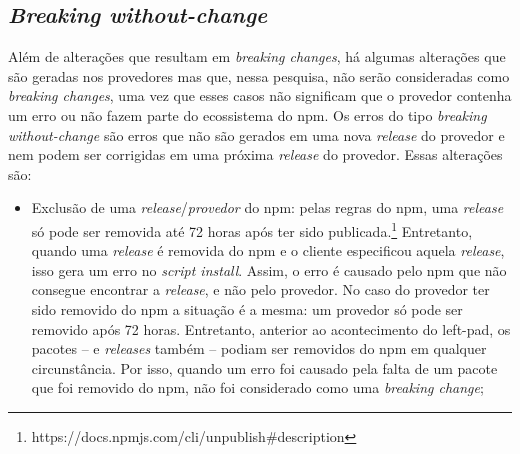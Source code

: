 \subsection{\textit{Breaking without-change}}
\label{subsec:break_without}
Além de alterações que resultam em \textit{breaking changes}, há algumas alterações que são geradas nos provedores mas que, nessa pesquisa, não serão consideradas como \textit{breaking changes}, uma vez que esses casos não significam que o provedor contenha um erro ou não fazem parte do ecossistema do \textsf{npm}. Os erros do tipo \textit{breaking without-change} são erros que não são gerados em uma nova \textit{release} do provedor e nem podem ser corrigidas em uma próxima \textit{release} do provedor. Essas alterações são:

\begin{itemize}

    \item Exclusão de uma \textit{release}/\textit{provedor} do \textsf{npm}: pelas regras do \textsf{npm}, uma \textit{release} só pode ser removida até 72 horas após ter sido publicada.\footnote{https://docs.npmjs.com/cli/unpublish\#description} Entretanto, quando uma \textit{release} é removida do \textsf{npm} e o cliente especificou aquela \textit{release}, isso gera um erro no \textit{script install}. Assim, o erro é causado pelo \textsf{npm} que não consegue encontrar a \textit{release}, e não pelo provedor. No caso do provedor ter sido removido do \textsf{npm} a situação é a mesma: um provedor só pode ser removido após 72 horas. Entretanto, anterior ao acontecimento do \textsf{left-pad}, os pacotes -- e \textit{releases} também -- podiam ser removidos do \textsf{npm} em qualquer circunstância. Por isso, quando um erro foi causado pela falta de um pacote que foi removido do \textsf{npm}, não foi considerado como uma \textit{breaking change};


\end{itemize}
